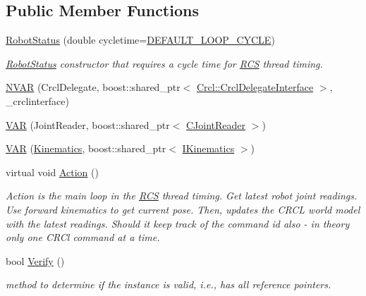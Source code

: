 \subsection*{Public Member Functions}
\begin{DoxyCompactItemize}
\item 
\hyperlink{classRCS_1_1RobotStatus_a3a4edecf6814bd37db609104517983a1}{Robot\-Status} (double cycletime=\hyperlink{RCS_8h_a226eb3a426e9df46b88c4ba34f217203}{D\-E\-F\-A\-U\-L\-T\-\_\-\-L\-O\-O\-P\-\_\-\-C\-Y\-C\-L\-E})
\begin{DoxyCompactList}\small\item\em \hyperlink{classRCS_1_1RobotStatus}{Robot\-Status} constructor that requires a cycle time for \hyperlink{namespaceRCS}{R\-C\-S} thread timing. \end{DoxyCompactList}\item 
\hyperlink{classRCS_1_1RobotStatus_aed67d1057ff99ebe1221aa9fdc3c9e04}{N\-V\-A\-R} (Crcl\-Delegate, boost\-::shared\-\_\-ptr$<$ \hyperlink{classCrcl_1_1CrclDelegateInterface}{Crcl\-::\-Crcl\-Delegate\-Interface} $>$, \-\_\-crclinterface)
\item 
\hyperlink{classRCS_1_1RobotStatus_abd9c969c564c66c5dd4ae92699172742}{V\-A\-R} (Joint\-Reader, boost\-::shared\-\_\-ptr$<$ \hyperlink{classCJointReader}{C\-Joint\-Reader} $>$)
\item 
\hyperlink{classRCS_1_1RobotStatus_abdcfb3be4ed2558ca3e5c745dc669340}{V\-A\-R} (\hyperlink{SanityCheckTests_8cpp_ac2d60ae645ce73be6021c92b37789e7c}{Kinematics}, boost\-::shared\-\_\-ptr$<$ \hyperlink{classIKinematics}{I\-Kinematics} $>$)
\item 
virtual void \hyperlink{classRCS_1_1RobotStatus_a7b8484b6d7ad5ae10e41a5d327efc658}{Action} ()
\begin{DoxyCompactList}\small\item\em Action is the main loop in the \hyperlink{namespaceRCS}{R\-C\-S} thread timing. Get latest robot joint readings. Use forward kinematics to get current pose. Then, updates the C\-R\-C\-L world model with the latest readings.  Should it keep track of the command id also -\/ in theory only one C\-R\-Cl command at a time. \end{DoxyCompactList}\item 
bool \hyperlink{classRCS_1_1RobotStatus_aad11542a68b43feb8c327abafbd94344}{Verify} ()
\begin{DoxyCompactList}\small\item\em method to determine if the instance is valid, i.\-e., has all reference pointers. \end{DoxyCompactList}\end{DoxyCompactItemize}
